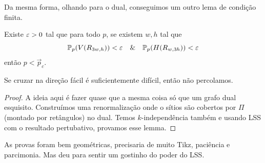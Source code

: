 Da mesma forma, olhando para o dual, conseguimos um outro lema de
condição finita.
\begin{lemma}
	Existe $\varepsilon > 0$ tal que para todo $p$, se existem $w,h$ tal que
	\[
		\mathbb{P}_p(V(R_{3w,h})) < \varepsilon \quad \& \quad \mathbb{P}_p(H(R_{w,3h})) < \varepsilon
	\]
	então $p < \vec{p}_c$.
\end{lemma}
\begin{remark}
	Se cruzar na direção fácil é suficientemente difícil, então não percolamos.
\end{remark}
\begin{proof}
	A ideia aqui é fazer quase que a mesma coisa só que um grafo dual esquisito.
	Construímos uma renormalização onde o sítios são cobertos por $\Pi$
	(montado por retângulos) no dual.
	Temos $k$-independência também e usando LSS com o resultado
	pertubativo, provamos
	esse lemma.
\end{proof}

\begin{obs}
	As provas foram bem geométricas, precisaria de muito Tikz, paciência
	e parcimonia. Mas deu
	para sentir um gostinho do poder do LSS.
\end{obs}
